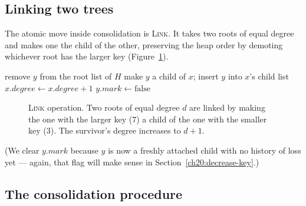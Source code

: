 \subsection{Linking two trees}

The atomic move inside consolidation is \textsc{Link}. It takes two roots of equal
degree and makes one the child of the other, preserving the heap order by demoting
whichever root has the larger key (Figure~\ref{fig:ch20-link}).

\begin{algorithm}[H]
\caption{\textsc{Link}($H$, $y$, $x$)\quad // assumes $x.\mathit{key} \le y.\mathit{key}$}
remove $y$ from the root list of $H$\;
make $y$ a child of $x$; insert $y$ into $x$'s child list\;
$x.\mathit{degree} \gets x.\mathit{degree} + 1$\;
$y.\mathit{mark} \gets \text{false}$\;
\end{algorithm}

\begin{figure}[htbp]
\centering
{}
\caption{\textsc{Link} operation. Two roots of equal degree $d$ are linked by making the one with the larger key ($7$) a child of the one with the smaller key ($3$). The survivor's degree increases to $d+1$.}
\label{fig:ch20-link}
\end{figure}

(We clear $y.\mathit{mark}$ because $y$ is now a freshly attached child with no
history of loss yet --- again, that flag will make sense in
Section~\ref{ch20:decrease-key}.)

\subsection{The consolidation procedure}

